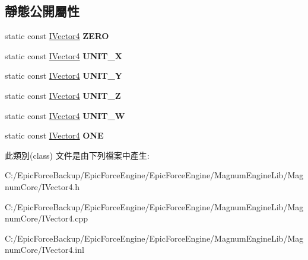 \subsection*{靜態公開屬性}
\begin{DoxyCompactItemize}
\item 
static const \hyperlink{class_magnum_1_1_i_vector4}{I\+Vector4} {\bfseries Z\+E\+RO}\hypertarget{class_magnum_1_1_i_vector4_a2936d1ecb36c0525729538d756102516}{}\label{class_magnum_1_1_i_vector4_a2936d1ecb36c0525729538d756102516}

\item 
static const \hyperlink{class_magnum_1_1_i_vector4}{I\+Vector4} {\bfseries U\+N\+I\+T\+\_\+X}\hypertarget{class_magnum_1_1_i_vector4_af74fc1b74e57faa9371807c87a794de5}{}\label{class_magnum_1_1_i_vector4_af74fc1b74e57faa9371807c87a794de5}

\item 
static const \hyperlink{class_magnum_1_1_i_vector4}{I\+Vector4} {\bfseries U\+N\+I\+T\+\_\+Y}\hypertarget{class_magnum_1_1_i_vector4_a505c8e224fd962d8592dad48b8dd54f4}{}\label{class_magnum_1_1_i_vector4_a505c8e224fd962d8592dad48b8dd54f4}

\item 
static const \hyperlink{class_magnum_1_1_i_vector4}{I\+Vector4} {\bfseries U\+N\+I\+T\+\_\+Z}\hypertarget{class_magnum_1_1_i_vector4_a2497e3bde1d5c44b1f9ff941ed3e2672}{}\label{class_magnum_1_1_i_vector4_a2497e3bde1d5c44b1f9ff941ed3e2672}

\item 
static const \hyperlink{class_magnum_1_1_i_vector4}{I\+Vector4} {\bfseries U\+N\+I\+T\+\_\+W}\hypertarget{class_magnum_1_1_i_vector4_a179f1fa40a46a7a89da084be4f9977c9}{}\label{class_magnum_1_1_i_vector4_a179f1fa40a46a7a89da084be4f9977c9}

\item 
static const \hyperlink{class_magnum_1_1_i_vector4}{I\+Vector4} {\bfseries O\+NE}\hypertarget{class_magnum_1_1_i_vector4_af77d0a37bde6a29e8032c2fe19595a8e}{}\label{class_magnum_1_1_i_vector4_af77d0a37bde6a29e8032c2fe19595a8e}

\end{DoxyCompactItemize}


此類別(class) 文件是由下列檔案中產生\+:\begin{DoxyCompactItemize}
\item 
C\+:/\+Epic\+Force\+Backup/\+Epic\+Force\+Engine/\+Epic\+Force\+Engine/\+Magnum\+Engine\+Lib/\+Magnum\+Core/I\+Vector4.\+h\item 
C\+:/\+Epic\+Force\+Backup/\+Epic\+Force\+Engine/\+Epic\+Force\+Engine/\+Magnum\+Engine\+Lib/\+Magnum\+Core/I\+Vector4.\+cpp\item 
C\+:/\+Epic\+Force\+Backup/\+Epic\+Force\+Engine/\+Epic\+Force\+Engine/\+Magnum\+Engine\+Lib/\+Magnum\+Core/I\+Vector4.\+inl\end{DoxyCompactItemize}
